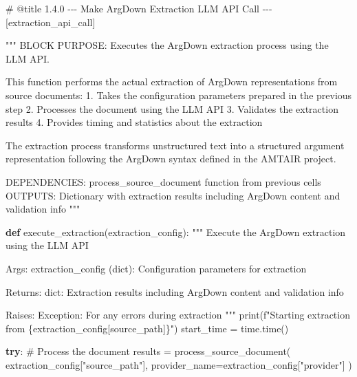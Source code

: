 \documentclass[
  11pt,
  letterpaper,
]{book}
\newenvironment{Shaded}{\begin{snugshade}}{\end{snugshade}}
\newcommand{\BuiltInTok}[1]{\textcolor[rgb]{0.00,0.23,0.31}{#1}}
\newcommand{\CommentTok}[1]{\textcolor[rgb]{0.37,0.37,0.37}{#1}}
\newcommand{\ControlFlowTok}[1]{\textcolor[rgb]{0.00,0.23,0.31}{\textbf{#1}}}
\newcommand{\KeywordTok}[1]{\textcolor[rgb]{0.00,0.23,0.31}{\textbf{#1}}}
\newcommand{\NormalTok}[1]{\textcolor[rgb]{0.00,0.23,0.31}{#1}}
\newcommand{\OperatorTok}[1]{\textcolor[rgb]{0.37,0.37,0.37}{#1}}
\newcommand{\SpecialCharTok}[1]{\textcolor[rgb]{0.37,0.37,0.37}{#1}}
\newcommand{\SpecialStringTok}[1]{\textcolor[rgb]{0.13,0.47,0.30}{#1}}
\newcommand{\StringTok}[1]{\textcolor[rgb]{0.13,0.47,0.30}{#1}}
\begin{document}
\label{extraction_api_call}
\begin{Shaded}
\begin{Highlighting}[]
\CommentTok{\# @title 1.4.0 {-}{-}{-} Make ArgDown Extraction LLM API Call {-}{-}{-} [extraction\_api\_call]}

\CommentTok{"""}
\CommentTok{BLOCK PURPOSE: Executes the ArgDown extraction process using the LLM API.}

\CommentTok{This function performs the actual extraction of ArgDown representations from}
\CommentTok{source documents:}
\CommentTok{1. Takes the configuration parameters prepared in the previous step}
\CommentTok{2. Processes the document using the LLM API}
\CommentTok{3. Validates the extraction results}
\CommentTok{4. Provides timing and statistics about the extraction}

\CommentTok{The extraction process transforms unstructured text into a structured argument}
\CommentTok{representation following the ArgDown syntax defined in the AMTAIR project.}

\CommentTok{DEPENDENCIES: process\_source\_document function from previous cells}
\CommentTok{OUTPUTS: Dictionary with extraction results including ArgDown content and validation info}
\CommentTok{"""}

\KeywordTok{def}\NormalTok{ execute\_extraction(extraction\_config):}
    \CommentTok{"""}
\CommentTok{    Execute the ArgDown extraction using the LLM API}

\CommentTok{    Args:}
\CommentTok{        extraction\_config (dict): Configuration parameters for extraction}

\CommentTok{    Returns:}
\CommentTok{        dict: Extraction results including ArgDown content and validation info}

\CommentTok{    Raises:}
\CommentTok{        Exception: For any errors during extraction}
\CommentTok{    """}
    \BuiltInTok{print}\NormalTok{(}\SpecialStringTok{f"Starting extraction from }\SpecialCharTok{\{}\NormalTok{extraction\_config[}\StringTok{\textquotesingle{}source\_path\textquotesingle{}}\NormalTok{]}\SpecialCharTok{\}}\SpecialStringTok{"}\NormalTok{)}
\NormalTok{    start\_time }\OperatorTok{=}\NormalTok{ time.time()}

    \ControlFlowTok{try}\NormalTok{:}
        \CommentTok{\# Process the document}
\NormalTok{        results }\OperatorTok{=}\NormalTok{ process\_source\_document(}
\NormalTok{            extraction\_config[}\StringTok{"source\_path"}\NormalTok{],}
\NormalTok{            provider\_name}\OperatorTok{=}\NormalTok{extraction\_config[}\StringTok{"provider"}\NormalTok{]}
\NormalTok{        )}


\end{Highlighting}
\end{Shaded}
\end{document}
